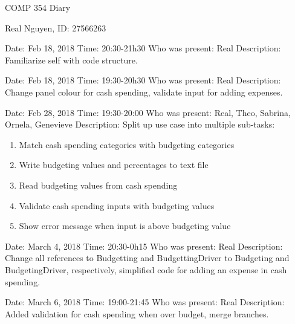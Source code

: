 \documentclass{article}
\begin{document}
 
\begin{center}
    COMP 354 Diary
\end{center}
 
\begin{center}
    Real Nguyen, ID: 27566263
\end{center}
 
\begin{flushleft}
Date: Feb 18, 2018 \newline
Time: 20:30-21h30 \newline
Who was present: Real\newline
Description: Familiarize self with code structure.\newline
\end{flushleft}
 
\begin{flushleft}
Date: Feb 18, 2018 \newline
Time: 19:30-20h30 \newline
Who was present: Real\newline
Description: Change panel colour for cash spending, validate input for adding expenses.\newline
\end{flushleft}
 
\begin{flushleft}
Date: Feb 28, 2018 \newline
Time: 19:30-20:00 \newline
Who was present: Real, Theo, Sabrina, Ornela, Genevieve\newline
Description: Split up use case into multiple sub-tasks:
\begin{enumerate}
  \item Match cash spending categories with budgeting categories
  \item Write budgeting values and percentages to text file
  \item Read budgeting values from cash spending
  \item Validate cash spending inputs with budgeting values
  \item Show error message when input is above budgeting value
\end{enumerate}
\end{flushleft}

\begin{flushleft}
Date: March 4, 2018 \newline
Time: 20:30-0h15 \newline
Who was present: Real\newline
Description: Change all references to Budgetting and BudgettingDriver to Budgeting and BudgetingDriver, respectively, simplified code for adding an expense in cash spending.\newline
\end{flushleft}

\begin{flushleft}
Date: March 6, 2018 \newline
Time: 19:00-21:45 \newline
Who was present: Real\newline
Description: Added validation for cash spending when over budget, merge branches.\newline
\end{flushleft}
 
\end{document}
